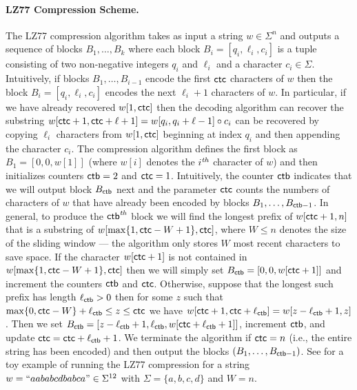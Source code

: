 \paragraph*{LZ77 Compression Scheme.} 
The LZ77 compression algorithm \cite{LZ77} takes as input a string $w \in \Sigma^n$ and outputs a sequence of blocks $B_1,\ldots, B_k$ where each block $B_i =[q_i, \ell_i, c_i]$ is a tuple consisting of two non-negative integers $q_i$ and $\ell_i$ and a character $c_i \in \Sigma$. Intuitively, if blocks $B_1,\ldots, B_{i-1}$ encode the first $\mathsf{ctc}$ characters of $w$ then the block $B_i =[q_i, \ell_i, c_i]$ encodes the next $\ell_i +1$ characters of $w$. In particular, if we have already recovered $w[1,\mathsf{ctc}]$ then the decoding algorithm can recover the substring $w[\mathsf{ctc}+1,\mathsf{ctc}+\ell+1] = w[q_i,q_i+\ell-1] \circ c_i$ can be recovered by copying $\ell_i$ characters from $w[1,\mathsf{ctc}]$ beginning at index $q_i$ and then appending the character $c_i$. The compression algorithm defines the first block as $B_1 = [0,0,w[1]]$ (where $w[i]$ denotes the $i^{\mbox{\scriptsize{\textit{th}}}}$ character of $w$) and then initializes counters $\mathsf{ctb}=2$ and $\mathsf{ctc}=1$. Intuitively, the counter $\mathsf{ctb}$ indicates that we will output block $B_{\mathsf{ctb}}$ next and the parameter $\mathsf{ctc}$ counts the numbers of characters of $w$ that have already been encoded by blocks $B_1,\ldots, B_{\mathsf{ctb}-1}$. In general, to produce the $\mathsf{ctb}^{\mbox{\scriptsize{\textit{th}}}}$ block we will find the longest prefix of $w[\mathsf{ctc}+1,n]$ that is a substring of $w[\max\{1,\mathsf{ctc}-W+1\},\mathsf{ctc}]$, where $W\leq n$ denotes the size of the sliding window --- the algorithm only stores $W$ most recent characters to save space. If the character $w[\mathsf{ctc}+1]$ is not contained in $w[\max\{1,\mathsf{ctc}-W+1\},\mathsf{ctc}]$ then we will simply set $B_{\mathsf{ctb}}=[0,0,w[\mathsf{ctc}+1]]$ and increment the counters $\mathsf{ctb}$ and $\mathsf{ctc}$. Otherwise, suppose that the longest such prefix has length $\ell_{\mathsf{ctb}} > 0$ then for some $z$ such that $\max\{0,\mathsf{ctc}-W\}+\ell_{\mathsf{ctb}}\leq z\leq \mathsf{ctc}$ we have $w[\mathsf{ctc}+1,\mathsf{ctc}+\ell_{\mathsf{ctb}}] = w[z-\ell_{\mathsf{ctb}}+1,z]$. Then we set $B_{\mathsf{ctb}} = [z-\ell_{\mathsf{ctb}}+1, \ell_{\mathsf{ctb}}, w[\mathsf{ctc}+\ell_{\mathsf{ctb}}+1]]$, increment $\mathsf{ctb}$, and update $\mathsf{ctc} = \mathsf{ctc}+\ell_{\mathsf{ctb}}+1$. We terminate the algorithm if $\mathsf{ctc}=n$ (i.e., the entire string has been encoded) and then output the blocks $(B_1,\ldots,B_{\mathsf{ctb}-1})$. See  for a toy example of running the LZ77 compression for a string $w=``aababcdbabca"\in\Sigma^{12}$ with $\Sigma=\{a,b,c,d\}$ and $W=n$.




